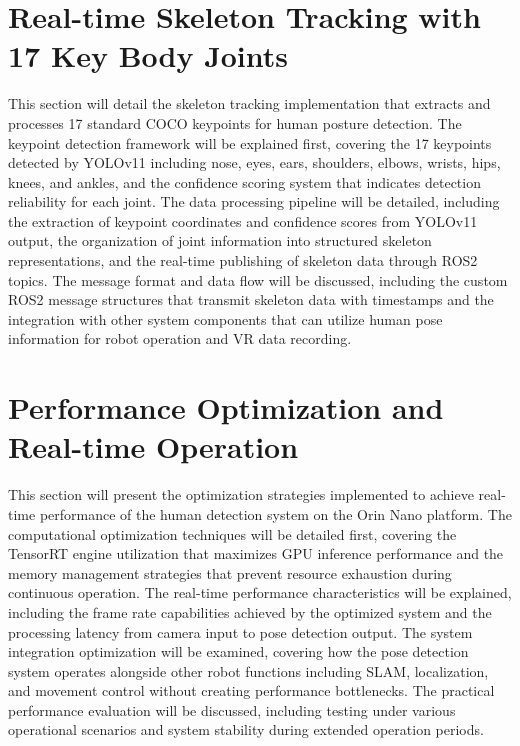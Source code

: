 \section{Real-time Skeleton Tracking with 17 Key Body Joints}
This section will detail the skeleton tracking implementation that extracts and processes 17 standard COCO keypoints for human posture detection. The keypoint detection framework will be explained first, covering the 17 keypoints detected by YOLOv11 including nose, eyes, ears, shoulders, elbows, wrists, hips, knees, and ankles, and the confidence scoring system that indicates detection reliability for each joint. The data processing pipeline will be detailed, including the extraction of keypoint coordinates and confidence scores from YOLOv11 output, the organization of joint information into structured skeleton representations, and the real-time publishing of skeleton data through ROS2 topics. The message format and data flow will be discussed, including the custom ROS2 message structures that transmit skeleton data with timestamps and the integration with other system components that can utilize human pose information for robot operation and VR data recording.

\section{Performance Optimization and Real-time Operation}
This section will present the optimization strategies implemented to achieve real-time performance of the human detection system on the Orin Nano platform. The computational optimization techniques will be detailed first, covering the TensorRT engine utilization that maximizes GPU inference performance and the memory management strategies that prevent resource exhaustion during continuous operation. The real-time performance characteristics will be explained, including the frame rate capabilities achieved by the optimized system and the processing latency from camera input to pose detection output. The system integration optimization will be examined, covering how the pose detection system operates alongside other robot functions including SLAM, localization, and movement control without creating performance bottlenecks. The practical performance evaluation will be discussed, including testing under various operational scenarios and system stability during extended operation periods.

